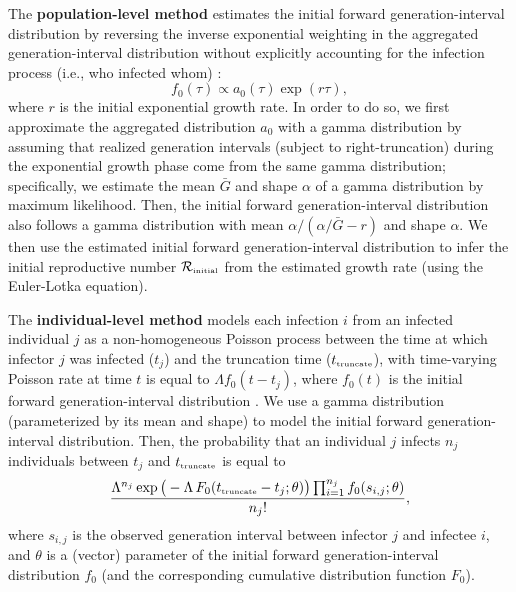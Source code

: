 \documentclass[12pt]{article}
\newcommand{\Rx}[1]{\ensuremath{{\mathcal R}_{#1}}\xspace}
\newcommand{\Rini}{\Rx{\textrm{\tiny initial}}}
\newcommand{\tsub}[2]{#1_{{\textrm{\tiny #2}}}}
\begin{document}
The \textbf{population-level method} estimates the initial forward generation-interval distribution by reversing the inverse exponential weighting in the aggregated generation-interval distribution without explicitly accounting for the infection process (i.e., who infected whom) \citep{tomba2010some, nishiura2010time, britton2019estimation}:
\begin{equation}
f_0(\tau) \propto a_0(\tau) \exp(r\tau),
\end{equation}
where $r$ is the initial exponential growth rate.
In order to do so, we first approximate the aggregated distribution $a_0$ with a gamma distribution by assuming that realized generation intervals (subject to right-truncation) during the exponential growth phase come from the same gamma distribution;
specifically, we estimate the mean $\bar G$ and shape $\alpha$ of a gamma distribution by maximum likelihood.
Then, the initial forward generation-interval distribution also follows a gamma distribution with mean $\alpha/(\alpha/\bar G - r)$ and shape $\alpha$.
We then use the estimated initial forward generation-interval distribution to infer the initial reproductive number $\Rini$ from the estimated growth rate (using the Euler-Lotka equation).

The \textbf{individual-level method} models each infection $i$ from an infected individual $j$ as a non-homogeneous Poisson process between the time at which infector $j$ was infected ($t_j$) and the truncation time ($\tsub{t}{truncate}$), with time-varying Poisson rate at time $t$ is equal to $\Lambda f_0(t - t_j)$, where $f_0(t)$ is the initial forward generation-interval distribution \citep{daley2007introduction}.
We use a gamma distribution (parameterized by its mean and shape) to model the initial forward generation-interval distribution.
Then, the probability that an individual $j$ infects $n_j$ individuals between $t_j$ and $\tsub{t}{truncate}$ is equal to
\begin{equation}
\frac{\Lambda^{n_j} \exp \big(- \Lambda\, F_0(\tsub{t}{truncate} - t_j ;\theta) \big) \prod_{i=1}^{n_j} f_0(s_{i, j}; \theta)}{n_j!},
\end{equation}
where $s_{i,j}$ is the observed generation interval between infector $j$ and infectee $i$, and $\theta$ is a (vector) parameter of the initial forward generation-interval distribution $f_0$ (and the corresponding cumulative distribution function $F_0$).
\end{document}
